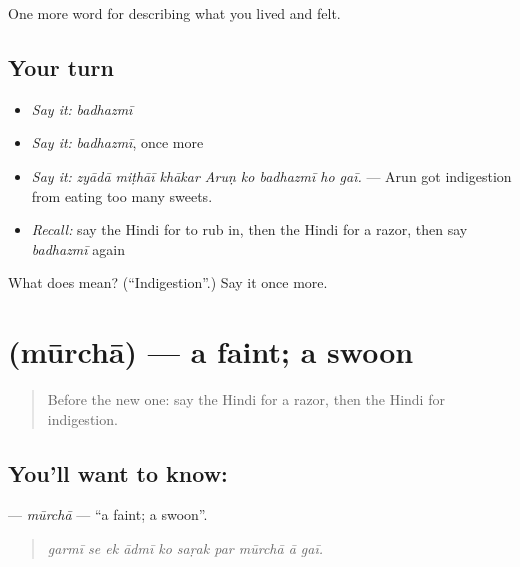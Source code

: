 \begin{grammarlens}[title={What you've built}]
One more word for describing what you lived and felt.
\end{grammarlens}

\subsection*{Your turn}
\begin{itemize}
\raggedright
  \item \emph{Say it:} \emph{badhazmī}
  \item \emph{Say it:} \emph{badhazmī}, once more
  \item \emph{Say it:} \emph{zyādā miṭhāī khākar Aruṇ ko badhazmī ho gaī.} — Arun got indigestion from eating too many sweets.
  \item \emph{Recall:} say the Hindi for to rub in, then the Hindi for a razor, then say \emph{badhazmī} again
\end{itemize}

\begin{tcolorbox}[breakable,colback=teal!4,colframe=teal!35!black,title={Before you move on}]
What does  mean? (\textquotedblleft{}Indigestion\textquotedblright{}.) Say it once more.
\end{tcolorbox}
\section[\texorpdfstring{\hi{मूर्छा} (mūrchā)}{मूर्छा (mūrchā)}]{ (mūrchā) — a faint; a swoon}

\label{lesson:HI-C485-murcha}



\begin{quote}
Before the new one: say the Hindi for a razor, then the Hindi for indigestion.
\end{quote}

\subsection*{You'll want to know: }
\textbf{} — \emph{mūrchā} — \textquotedblleft{}a faint; a swoon\textquotedblright{}.

\begin{quote}
         
\end{quote}

\begin{quote}
\emph{garmī se ek ādmī ko saṛak par mūrchā ā gaī.}
\end{quote}

